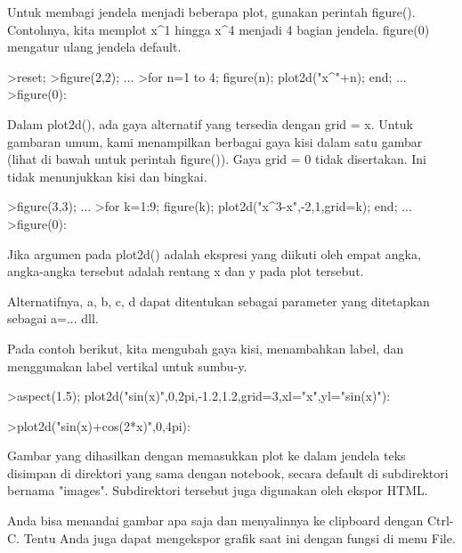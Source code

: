 \documentclass{article}
\begin{document}
\begin{eulernotebook}
\begin{eulercomment}
\begin{eulercomment}
\begin{eulercomment}
\begin{eulercomment}
\begin{eulercomment}
Untuk membagi jendela menjadi beberapa plot, gunakan perintah
figure(). Contohnya, kita memplot x\textasciicircum{}1 hingga x\textasciicircum{}4 menjadi 4 bagian
jendela. figure(0) mengatur ulang jendela default.
\end{eulercomment}
\begin{eulerprompt}
>reset;
>figure(2,2); ...
>for n=1 to 4; figure(n); plot2d("x^"+n); end; ...
>figure(0):
\end{eulerprompt}
\begin{eulercomment}
Dalam plot2d(), ada gaya alternatif yang tersedia dengan grid = x.
Untuk gambaran umum, kami menampilkan berbagai gaya kisi dalam satu
gambar (lihat di bawah untuk perintah figure()). Gaya grid = 0 tidak
disertakan. Ini tidak menunjukkan kisi dan bingkai.
\end{eulercomment}
\begin{eulerprompt}
>figure(3,3); ...
>for k=1:9; figure(k); plot2d("x^3-x",-2,1,grid=k); end; ...
>figure(0):
\end{eulerprompt}
\begin{eulercomment}
Jika argumen pada plot2d() adalah ekspresi yang diikuti oleh empat
angka, angka-angka tersebut adalah rentang x dan y pada plot tersebut.

Alternatifnya, a, b, c, d dapat ditentukan sebagai parameter yang
ditetapkan sebagai a=... dll.

Pada contoh berikut, kita mengubah gaya kisi, menambahkan label, dan
menggunakan label vertikal untuk sumbu-y.
\end{eulercomment}
\begin{eulerprompt}
>aspect(1.5); plot2d("sin(x)",0,2pi,-1.2,1.2,grid=3,xl="x",yl="sin(x)"):
\end{eulerprompt}
\begin{eulerprompt}
>plot2d("sin(x)+cos(2*x)",0,4pi):
\end{eulerprompt}
\begin{eulercomment}
Gambar yang dihasilkan dengan memasukkan plot ke dalam jendela teks
disimpan di direktori yang sama dengan notebook, secara default di
subdirektori bernama "images". Subdirektori tersebut juga digunakan
oleh ekspor HTML.

Anda bisa menandai gambar apa saja dan menyalinnya ke clipboard dengan
Ctrl-C. Tentu Anda juga dapat mengekspor grafik saat ini dengan fungsi
di menu File.


\end{eulercomment}
\end{eulercomment}
\end{eulercomment}
\end{eulercomment}
\end{eulercomment}
\end{eulernotebook}
\end{document}

